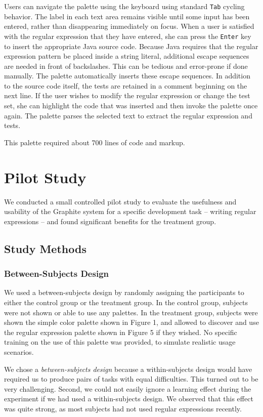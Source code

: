\documentclass[10pt, conference, compsocconf]{IEEEtran}
\begin{document}
Users can navigate the palette using the keyboard using standard \verb|Tab| cycling behavior. The label in each text area remains visible until some input has been entered, rather than disappearing immediately on focus. When a user is satisfied with the regular expression that they have entered, she can press the \verb|Enter| key to insert the appropriate Java source code. Because Java requires that the regular expression pattern be placed inside a string literal, additional escape sequences are needed in front of backslashes. This can be tedious and error-prone if done manually. The palette automatically inserts these escape sequences. In addition to the source code itself, the tests are retained in a comment beginning on the next line. If the user wishes to modify the regular expression or change the test set, she can highlight the code that was inserted and then invoke the palette once again. The palette parses the selected text to extract the regular expression and tests.

This palette required about 700 lines of code and markup.

\section{Pilot Study}

We conducted a small controlled pilot study to evaluate the usefulness and usability of the Graphite system for a specific development task -- writing regular expressions -- and found significant benefits for the treatment group.

\subsection{Study Methods}
\subsubsection{Between-Subjects Design}
We used a between-subjects design by randomly assigning the participants to either the control group or the treatment group. In the control group, subjects were not shown or able to use any palettes. In the treatment group, subjects were shown the simple color palette shown in Figure 1, and allowed to discover and use the regular expression palette shown in Figure 5 if they wished. No specific training on the use of this palette was provided, to simulate realistic usage scenarios.

We chose a \textit{between-subjects design} because a within-subjects design would have required us to produce pairs of tasks with equal difficulties. This turned out to be very challenging. Second, we could not easily ignore a learning effect during the experiment if we had used a within-subjects design. We observed that this effect was quite strong, as most subjects had not used regular expressions recently.
\end{document}
